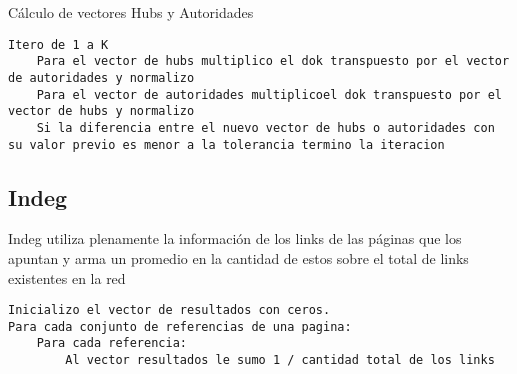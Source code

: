 Cálculo de vectores Hubs y Autoridades
\begin{lstlisting}[frame=single] 
Itero de 1 a K
	Para el vector de hubs multiplico el dok transpuesto por el vector de autoridades y normalizo
	Para el vector de autoridades multiplicoel dok transpuesto por el vector de hubs y normalizo
	Si la diferencia entre el nuevo vector de hubs o autoridades con su valor previo es menor a la tolerancia termino la iteracion
\end{lstlisting}

\subsection{Indeg}

Indeg utiliza plenamente la información de los links de las páginas que los apuntan y arma un promedio en la cantidad de estos sobre el total de links existentes en la red

\begin{lstlisting}[frame=single] 
Inicializo el vector de resultados con ceros.
Para cada conjunto de referencias de una pagina:
	Para cada referencia:
		Al vector resultados le sumo 1 / cantidad total de los links
	
\end{lstlisting}